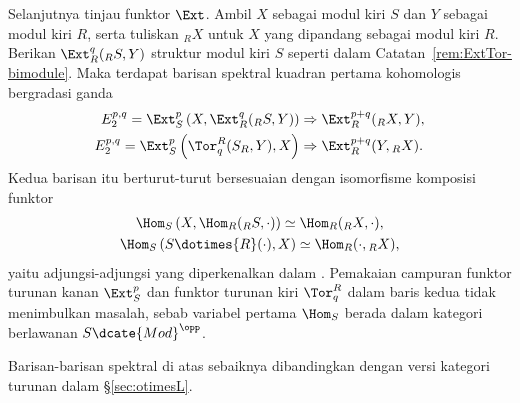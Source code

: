 \begin{example}
	Selanjutnya tinjau funktor $\Ext$. Ambil $X$ sebagai modul kiri $S$ dan
	$Y$ sebagai modul kiri $R$, serta tuliskan ${}_RX$ untuk $X$ yang dipandang
	sebagai modul kiri $R$. Berikan $\Ext_R^q({}_RS,Y)$ struktur modul kiri $S$
	seperti dalam Catatan~\ref{rem:ExtTor-bimodule}. Maka terdapat barisan
	spektral kuadran pertama kohomologis bergradasi ganda
	\begin{align*}
		E_2^{p,q} = \Ext_S^p\left( X, \Ext_R^q({}_R S, Y) \right) & \Rightarrow \Ext_R^{p+q}({}_R X, Y), \\
		E_2^{p,q} = \Ext_S^p\left( \Tor^R_q(S_R, Y), X \right) & \Rightarrow \Ext_R^{p+q}(Y, {}_R X).
	\end{align*}
	Kedua barisan itu berturut-turut bersesuaian dengan isomorfisme komposisi funktor
	\begin{gather*}
		\Hom_S\left( X, \Hom_R({}_R S, \cdot) \right) \simeq \Hom_R({}_R X, \cdot), \\
		\Hom_S\left( S \dotimes{R} (\cdot), X \right) \simeq \Hom_R(\cdot, {}_R X),
	\end{gather*}
	yaitu adjungsi-adjungsi yang diperkenalkan dalam
	\cite[Korolari 6.6.8]{Li1}. Pemakaian campuran funktor turunan kanan
	$\Ext_S^p$ dan funktor turunan kiri $\Tor^R_q$ dalam baris kedua tidak
	menimbulkan masalah, sebab variabel pertama $\Hom_S$ berada dalam kategori
	berlawanan $S\dcate{Mod}^{\opp}$.
\end{example}

Barisan-barisan spektral di atas sebaiknya dibandingkan dengan versi kategori
turunan dalam \S\ref{sec:otimesL}.

